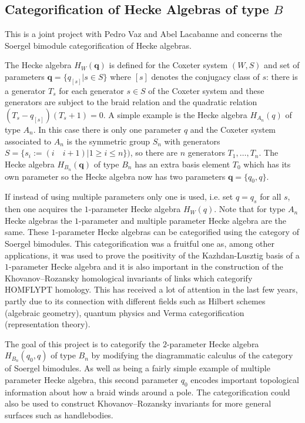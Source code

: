 \documentclass{article}
\begin{document}

\subsection{Categorification of Hecke Algebras of type $B$}
This is a joint project with Pedro Vaz and Abel Lacabanne and concerns the Soergel bimodule categorification of Hecke algebras.

The Hecke algebra $H_W(\mathbf{q})$ is defined for the Coxeter system $(W, S)$ and set of parameters $\mathbf{q} = \{q_{[s]} | s \in S\}$ where $[s]$ denotes the conjugacy class of $s$: there is a generator $T_s$ for each generator $s \in S$ of the Coxeter system and these generators are subject to the braid relation and the quadratic relation $(T_s-q_{[s]})(T_s +1) = 0$. 
A simple example is the Hecke algebra  $H_{A_n}(q)$ of type $A_n$. In this case there is only one parameter $q$ and the Coxeter system associated to $A_n$ is the symmetric group $S_n$ with generators $S = \{s_i := (i \quad i+1 )| 1 \geq i \leq n\})$, so there are $n$ generators $T_1, \dots, T_n$. The Hecke algebra $H_{B_n}(\mathbf{q})$ of type $ B_n $ has an extra basis element $T_0$ which has its own parameter so the Hecke algebra now has two parameters $\mathbf{q} = \{q_0, q\}$.

If instead of using multiple parameters only one is used, i.e. set $q=q_s$ for all $s$, then one acquires the $1$-parameter Hecke algebra $H_W(q)$. Note that for type $A_n$ Hecke algebras the $1$-parameter and multiple parameter Hecke algebra are the same.
These $1$-parameter Hecke algebras can be categorified using the category of Soergel bimodules. This categorification was a fruitful one as, among other applications, it was used to prove the positivity of the Kazhdan-Lusztig basis of a $1$-parameter Hecke algebra and it is also important in the construction of the Khovanov--Rozansky homological invariants of links which categorify HOMFLYPT homology. This  has received a lot of attention in the last few years, partly due to its connection with different fields such as Hilbert schemes (algebraic geometry), quantum physics and Verma categorification (representation theory).

The goal of this project is to categorify the $2$-parameter Hecke algebra $H_{B_n}(q_0,q)$ of type $B_n$ by modifying the diagrammatic calculus of the category of Soergel bimodules. As well as being a fairly simple example of multiple parameter Hecke algebra, this second parameter $q_0$ encodes important topological information about how a braid winds around a pole. The categorification could also be used to construct Khovanov--Rozansky invariants for more general surfaces such as handlebodies. 
\end{document}
